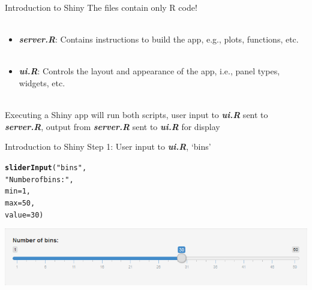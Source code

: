 \documentclass[serif]{beamer}\usepackage[]{graphicx}\usepackage[]{color}
\makeatletter
\newcommand{\hlnum}[1]{\textcolor[rgb]{0.686,0.059,0.569}{#1}}%
\newcommand{\hlstr}[1]{\textcolor[rgb]{0.192,0.494,0.8}{#1}}%
\newcommand{\hlstd}[1]{\textcolor[rgb]{0.345,0.345,0.345}{#1}}%
\newcommand{\hlkwc}[1]{\textcolor[rgb]{0.333,0.667,0.333}{#1}}%
\newcommand{\hlkwd}[1]{\textcolor[rgb]{0.737,0.353,0.396}{\textbf{#1}}}%
\newenvironment{kframe}{%
 \def\at@end@of@kframe{}%
 \ifinner\ifhmode%
  \def\at@end@of@kframe{\end{minipage}}%
  \begin{minipage}{\columnwidth}%
 \fi\fi%
 \def\FrameCommand##1{\hskip\@totalleftmargin \hskip-\fboxsep
 \colorbox{shadecolor}{##1}\hskip-\fboxsep
     \hskip-\linewidth \hskip-\@totalleftmargin \hskip\columnwidth}%
 \MakeFramed {\advance\hsize-\width
   \@totalleftmargin\z@ \linewidth\hsize
   \@setminipage}}%
 {\par\unskip\endMakeFramed%
 \at@end@of@kframe}
\newcommand{\emtxt}[1]{\textbf{\textit{#1}}}
\makeatother
\begin{document}
\begin{frame}[t]{Introduction to Shiny}
The files contain only R code! \\~\\
\begin{itemize}
\item \emtxt{server.R}: Contains instructions to build the app, e.g., plots, functions, etc.\\~\\
\item \emtxt{ui.R}: Controls the layout and appearance of the app, i.e., panel types, widgets, etc. \\~\\
\end{itemize}
Executing a Shiny app will run both scripts, user input to \emtxt{ui.R} sent to \emtxt{server.R}, output from \emtxt{server.R} sent to \emtxt{ui.R} for display
\end{frame}

\begin{frame}[t, fragile]{Introduction to Shiny}
Step 1: User input to \emtxt{ui.R}, `bins'
\small
\begin{kframe}
\begin{alltt}
\hlkwd{sliderInput}\hlstd{(}\hlstr{"bins"}\hlstd{,}
            \hlstr{"Number of bins:"}\hlstd{,}
            \hlkwc{min} \hlstd{=} \hlnum{1}\hlstd{,}
            \hlkwc{max} \hlstd{=} \hlnum{50}\hlstd{,}
            \hlkwc{value} \hlstd{=} \hlnum{30}\hlstd{)}
\end{alltt}
\end{kframe}
\begin{center}
\includegraphics[width = \textwidth]{fig/sliderinput.png}
\end{center}
\end{frame}
\end{document}
